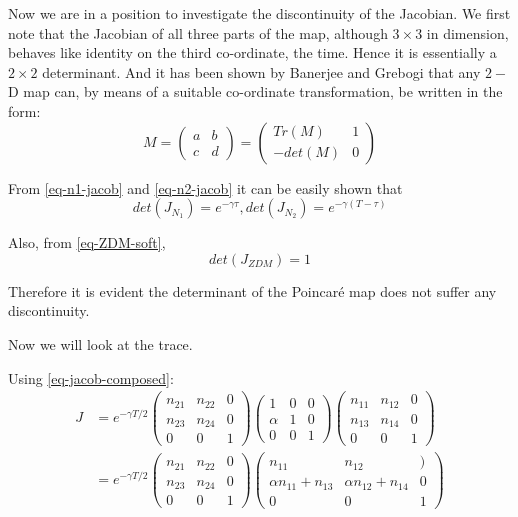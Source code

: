 \documentclass{book}
\renewcommand{\(}{\begin{columns}}
\renewcommand{\)}{\end{columns}}
\newcommand{\<}[1]{\begin{column}{#1}}
\renewcommand{\>}{\end{column}}
\begin{document}
Now we are in a position to investigate the discontinuity of the Jacobian.  We 
first note that the Jacobian of all three parts of the map, although 
$3\times 3$ in dimension, behaves like identity on the third co-ordinate, the 
time.  Hence it is essentially a $2\times 2$ determinant.  And it has been 
shown by Banerjee and Grebogi that any $2-$D map can, by means of a suitable 
co-ordinate transformation, be written in the form:
\[
M=
\begin{pmatrix}
a & b\\
c & d
\end{pmatrix}
=
\begin{pmatrix}
Tr(M) & 1\\
-det(M) & 0
\end{pmatrix}
\]


From \eqref{eq-n1-jacob} and  \eqref{eq-n2-jacob}  it can be easily shown that 
\[
det(J_{N_1})=e^{-\gamma\tau}, det(J_{N_2})=e^{-\gamma(T-\tau)}
\]

Also, from \eqref{eq-ZDM-soft}, \[
det(J_{ZDM})=1
\]

Therefore it is evident the determinant of the Poincaré map does not suffer 
any discontinuity.  

Now we will look at the trace.  

Using \eqref{eq-jacob-composed}:
\begin{align}
\label{eq-ZDM-total}
J&=e^{-\gamma T/2}
\begin{pmatrix}
n_{21} & n_{22} & 0\\
n_{23} & n_{24} & 0\\
0 & 0 & 1
\end{pmatrix}
\begin{pmatrix}
1 & 0 & 0\\
\alpha & 1 & 0\\
0 & 0 & 1
\end{pmatrix}
\begin{pmatrix}
n_{11} & n_{12} & 0\\
n_{13} & n_{14} & 0\\
0 & 0 & 1
\end{pmatrix}\\
&=e^{-\gamma T/2}
\begin{pmatrix}
n_{21} & n_{22} & 0\\
n_{23} & n_{24} & 0\\
0 & 0 & 1
\end{pmatrix}
\begin{pmatrix}
n_{11} & n_{12} & )\\
\alpha n_{11}+n_{13} & \alpha n_{12}+n_{14} & 0\\
0 & 0 & 1
\end{pmatrix}
\end{align}
\end{document}
